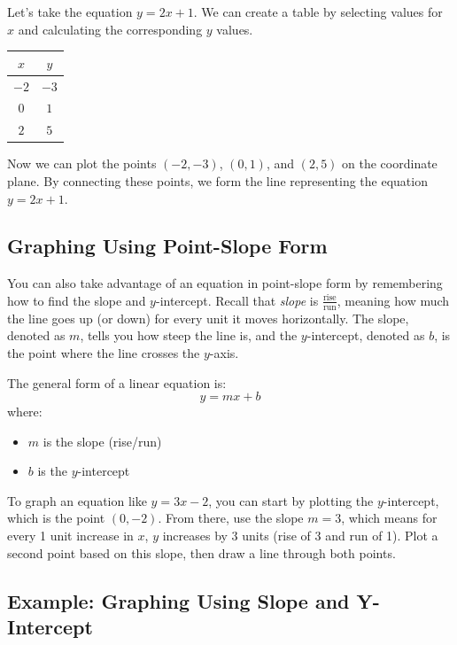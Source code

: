 \documentclass[12pt]{article}
\begin{document}
Let's take the equation \( y = 2x + 1 \). We can create a table by selecting
values for $x$ and calculating the corresponding $y$ values.

\begin{center}
  \begin{tabular}{cc}
    \hline
    $x$  & $y$  \\
    \hline
    $-2$ & $-3$ \\
    $0$  & $1$  \\
    $2$  & $5$  \\
    \hline
  \end{tabular}
\end{center}

Now we can plot the points $(-2, -3)$, $(0, 1)$, and $(2, 5)$ on the coordinate
plane. By connecting these points, we form the line representing the equation \(
y = 2x + 1 \).

\subsection{Graphing Using Point-Slope Form}

You can also take advantage of an equation in point-slope form by remembering
how to find the slope and $y$-intercept. Recall that \emph{slope} is
$\frac{\text{rise}}{\text{run}}$, meaning how much the line goes up (or down)
for every unit it moves horizontally. The slope, denoted as $m$, tells you how
steep the line is, and the $y$-intercept, denoted as $b$, is the point where the
line crosses the $y$-axis.

The general form of a linear equation is:
\[
  y = mx + b
\]
where:
\begin{itemize}
  \item $m$ is the slope (rise/run)
  \item $b$ is the $y$-intercept
\end{itemize}

To graph an equation like \( y = 3x - 2 \), you can start by plotting the
$y$-intercept, which is the point $(0, -2)$. From there, use the slope \( m = 3
\), which means for every 1 unit increase in $x$, $y$ increases by 3 units (rise
of 3 and run of 1). Plot a second point based on this slope, then draw a line
through both points.

\subsection{Example: Graphing Using Slope and Y-Intercept}
\end{document}
